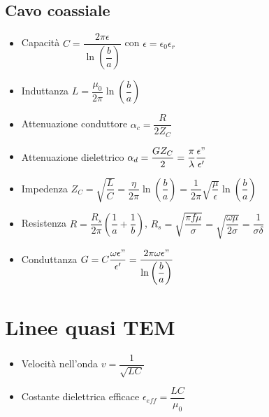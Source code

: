 \documentclass{article}
\begin{document}
\subsection{Cavo coassiale}
\begin{itemize}
	\item Capacità \( C = \dfrac{2 \pi \epsilon}{\ln\left(\dfrac{b}{a}\right)} \) con \( \epsilon = \epsilon_0 \epsilon_r \)
	\item Induttanza \( L = \dfrac{\mu_0}{2 \pi} \ln\left(\dfrac{b}{a}\right) \)
	\item Attenuazione conduttore \( \alpha_c = \dfrac{R}{2 Z_C} \)
	\item Attenuazione dielettrico \( \alpha_d = \dfrac{G Z_C}{2} = \dfrac{\pi}{\lambda}\dfrac{\epsilon"}{\epsilon'}\)
	\item Impedenza \( Z_C = \sqrt{\dfrac{L}{C}} = \dfrac{\eta}{2 \pi} \ln\left(\dfrac{b}{a} \right) =  \dfrac{1}{2 \pi} \sqrt{\dfrac{\mu}{\epsilon}} \ln\left(\dfrac{b}{a}\right)\)
	\item Resistenza \( R = \dfrac{R_s}{2 \pi} \left( \dfrac{1}{a} + \dfrac{1}{b} \right) \), \( R_s = \sqrt{\dfrac{\pi f \mu}{\sigma}} = \sqrt{\dfrac{\omega \mu}{2 \sigma}} = \dfrac{1}{\sigma \delta} \)
	\item Conduttanza \( G = C \dfrac{\omega\epsilon"}{\epsilon'} = \dfrac{2 \pi \omega \epsilon"}{\ln\left(\dfrac{b}{a} \right)} \)
\end{itemize}

\section{Linee quasi TEM}
\begin{itemize}
	\item Velocità nell'onda \( v = \dfrac{1}{\sqrt{LC}} \)
	\item Costante dielettrica efficace \( \epsilon_{eff} = \dfrac{LC}{\mu_0} \)
\end{itemize}

\newpage 
\end{document}
